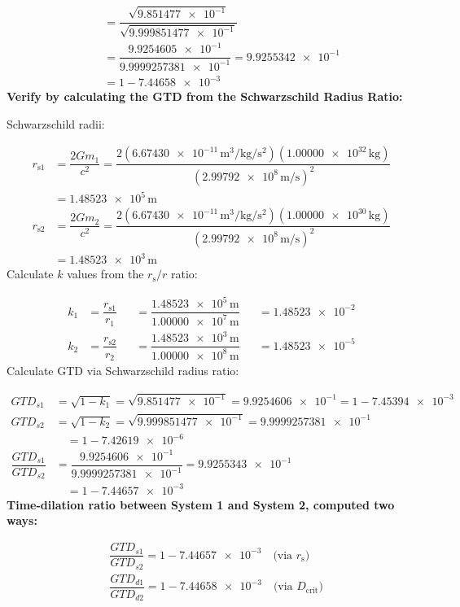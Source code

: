 \documentclass[twoside,twocolumn,9pt,fleqn]{article}
\begin{document}
\begin{mdframed}
\begin{align*}
&\quad = \dfrac{\sqrt{\num{9.851477e-1}}}{\sqrt{\num{9.999851477e-1}}}\\
&\quad = \dfrac{\num{9.9254605e-1}}{\num{9.9999257381e-1}} = \num{9.9255342e-1}\\
&\quad = 1-\num{7.44658e-3}
\end{align*}
\noindent\textbf{Verify by calculating the GTD from the Schwarzschild Radius Ratio:}\par
\noindent Schwarzschild radii:\par
\begin{align*}
r_{\mathrm{s}1} &= \dfrac{2Gm_1}{c^2} = \dfrac{2(\num{6.67430e-11}\,\unit{\meter\cubed\per\kilogram\per\second\squared})(\num{1.00000e32}\,\unit{\kilogram})}{(\num{2.99792e8}\,\unit{\meter\per\second})^2}\\
&= \num{1.48523e5}\,\unit{\meter}\\
r_{\mathrm{s}2} &= \dfrac{2Gm_2}{c^2} = \dfrac{2(\num{6.67430e-11}\,\unit{\meter\cubed\per\kilogram\per\second\squared})(\num{1.00000e30}\,\unit{\kilogram})}{(\num{2.99792e8}\,\unit{\meter\per\second})^2}\\
&= \num{1.48523e3}\,\unit{\meter}
\end{align*}
\noindent Calculate $k$ values from the $r_{\mathrm{s}}/r$ ratio:\par
\begin{align*}
k_1 &= \dfrac{r_{\mathrm{s}1}}{r_1} &&= \dfrac{\num{1.48523e5}\,\unit{\meter}}{\num{1.00000e7}\,\unit{\meter}} &&= \num{1.48523e-2}\\
k_2 &= \dfrac{r_{\mathrm{s}2}}{r_2} &&= \dfrac{\num{1.48523e3}\,\unit{\meter}}{\num{1.00000e8}\,\unit{\meter}} &&= \num{1.48523e-5}
\end{align*}
\noindent Calculate GTD via Schwarzschild radius ratio:\par
\begin{align*}
GTD_{s1} &= \sqrt{1-k_1} = \sqrt{\num{9.851477e-1}} = \num{9.9254606e-1} = 1-\num{7.45394e-3}\\
GTD_{s2} &= \sqrt{1-k_2} = \sqrt{\num{9.999851477e-1}} = \num{9.9999257381e-1}\\
&\quad = 1-\num{7.42619e-6}\\
\dfrac{GTD_{s1}}{GTD_{s2}} &= \dfrac{\num{9.9254606e-1}}{\num{9.9999257381e-1}} = \num{9.9255343e-1}\\
&\quad = 1-\num{7.44657e-3}
\end{align*}
\noindent\textbf{Time-dilation ratio between System 1 and System 2, computed two ways:}\par
\begin{align*}
&\dfrac{GTD_{s1}}{GTD_{s2}} = 1-\num{7.44657e-3} \quad \text{(via $r_{\mathrm{s}}$)}\\
&\dfrac{GTD_{d1}}{GTD_{d2}} = 1-\num{7.44658e-3} \quad \text{(via $D_{\mathrm{crit}}$)}
\end{align*}
\end{mdframed}
\end{document}
